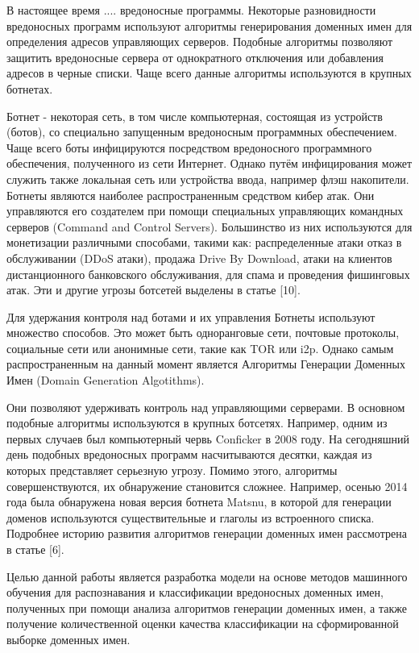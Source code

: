 
В настоящее время .... вредоносные программы.
Некоторые разновидности вредоносных программ используют алгоритмы генерирования доменных имен для определения адресов управляющих серверов. Подобные алгоритмы позволяют защитить вредоносные сервера от однократного отключения или добавления адресов в черные списки. Чаще всего данные алгоритмы используются в крупных ботнетах. 

Ботнет - некоторая сеть, в том числе компьютерная, состоящая из устройств (ботов), со специально запущенным вредоносным программных обеспечением. Чаще всего боты инфицируются посредством вредоносного программного обеспечения, полученного из сети Интернет. Однако путём инфицирования может служить также локальная сеть или устройства ввода, например флэш накопители. Ботнеты являются наиболее распространенным средством кибер атак. Они управляются его создателем при помощи специальных управляющих командных серверов (Command and Control Servers). Большинство из них используются для монетизации различными способами, такими как: распределенные атаки отказ в обслуживании (DDoS атаки), продажа Drive By Download, атаки на клиентов дистанционного банковского обслуживания, для спама и проведения фишинговых атак. Эти и другие угрозы ботсетей выделены в статье [10].

Для удержания контроля над ботами и их управления Ботнеты используют множество способов. Это может быть одноранговые сети, почтовые протоколы, социальные сети или анонимные сети, такие как TOR или i2p.
Однако самым распространенным на данный момент является Алгоритмы Генерации Доменных Имен (Domain Generation Algotithms).

Они позволяют удерживать контроль над управляющими серверами. В основном подобные алгоритмы используются в крупных ботсетях. Например, одним из первых случаев был компьютерный червь Conficker в 2008 году. На сегодняшний день подобных вредоносных программ насчитываются десятки, каждая из которых представляет серьезную угрозу. Помимо этого, алгоритмы совершенствуются, их обнаружение становится сложнее. Например, осенью 2014 года была обнаружена новая версия ботнета Matsnu, в которой для генерации доменов используются существительные и глаголы из встроенного списка. Подробнее историю развития алгоритмов генерации доменных имен рассмотрена в статье [6].

Целью данной работы является разработка модели на основе методов машинного обучения для распознавания и классификации вредоносных доменных имен, полученных при помощи анализа алгоритмов генерации доменных имен, а также получение количественной оценки качества классификации на сформированной выборке доменных имен.

